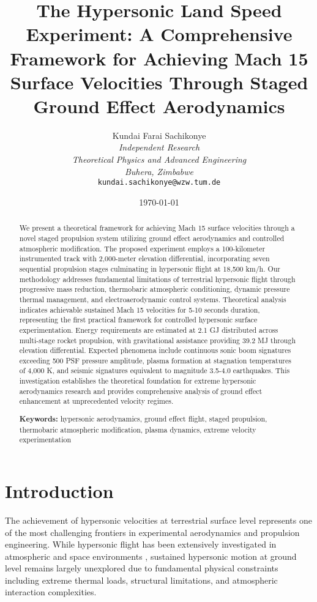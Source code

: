 \documentclass[12pt,a4paper]{article}
\title{\textbf{The Hypersonic Land Speed Experiment: A Comprehensive Framework for Achieving Mach 15 Surface Velocities Through Staged Ground Effect Aerodynamics}}
\author{
Kundai Farai Sachikonye\\
\textit{Independent Research}\\
\textit{Theoretical Physics and Advanced Engineering}\\
\textit{Buhera, Zimbabwe}\\
\texttt{kundai.sachikonye@wzw.tum.de}
}
\date{\today}
\begin{document}
\maketitle

\begin{abstract}
We present a theoretical framework for achieving Mach 15 surface velocities through a novel staged propulsion system utilizing ground effect aerodynamics and controlled atmospheric modification. The proposed experiment employs a 100-kilometer instrumented track with 2,000-meter elevation differential, incorporating seven sequential propulsion stages culminating in hypersonic flight at 18,500 km/h. Our methodology addresses fundamental limitations of terrestrial hypersonic flight through progressive mass reduction, thermobaric atmospheric conditioning, dynamic pressure thermal management, and electroaerodynamic control systems. Theoretical analysis indicates achievable sustained Mach 15 velocities for 5-10 seconds duration, representing the first practical framework for controlled hypersonic surface experimentation. Energy requirements are estimated at 2.1 GJ distributed across multi-stage rocket propulsion, with gravitational assistance providing 39.2 MJ through elevation differential. Expected phenomena include continuous sonic boom signatures exceeding 500 PSF pressure amplitude, plasma formation at stagnation temperatures of 4,000 K, and seismic signatures equivalent to magnitude 3.5-4.0 earthquakes. This investigation establishes the theoretical foundation for extreme hypersonic aerodynamics research and provides comprehensive analysis of ground effect enhancement at unprecedented velocity regimes.

\textbf{Keywords:} hypersonic aerodynamics, ground effect flight, staged propulsion, thermobaric atmospheric modification, plasma dynamics, extreme velocity experimentation
\end{abstract}

\section{Introduction}

The achievement of hypersonic velocities at terrestrial surface level represents one of the most challenging frontiers in experimental aerodynamics and propulsion engineering. While hypersonic flight has been extensively investigated in atmospheric and space environments \cite{anderson2006hypersonic, bertin2013hypersonic}, sustained hypersonic motion at ground level remains largely unexplored due to fundamental physical constraints including extreme thermal loads, structural limitations, and atmospheric interaction complexities.
\end{document}
